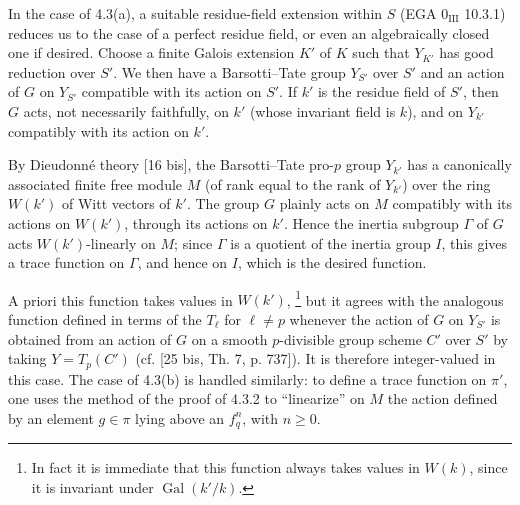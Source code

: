 In the case of 4.3(a), a suitable residue-field extension within $S$
(EGA $0_{\mathrm{III}}$ 10.3.1) reduces us to the case of a perfect
residue field, or even an algebraically closed one if desired.  Choose
a finite Galois extension $K'$ of $K$ such that $Y_{K'}$ has good
reduction over $S'$.  We then have a Barsotti--Tate group $Y_{S'}$ over
$S'$ and an action of $G$ on $Y_{S'}$ compatible with its action on
$S'$.  If $k'$ is the residue field of $S'$, then $G$ acts, not
necessarily faithfully, on $k'$ (whose invariant field is $k$), and on
$Y_{k'}$ compatibly with its action on $k'$.

By Dieudonn\'e theory [16 bis], the Barsotti--Tate pro-$p$ group $Y_{k'}$
has a canonically associated finite free module $M$ (of rank equal to
the rank of $Y_{k'}$) over the ring $W(k')$ of Witt vectors of $k'$.
The group $G$ plainly acts on $M$ compatibly with its actions on
$W(k')$, through its actions on $k'$.  Hence the inertia subgroup
$\Gamma$ of $G$ acts $W(k')$-linearly on $M$; since $\Gamma$ is a
quotient of the inertia group $I$, this gives a trace function on
$\Gamma$, and hence on $I$, which is the desired function.

A priori this function takes values in $W(k')$,
\footnote{In fact it is immediate that this function always takes values
in $W(k)$, since it is invariant under $\operatorname{Gal}(k'/k)$.}
but it agrees with the analogous function defined in terms of the
$T_\ell$ for $\ell\neq p$ whenever the action of $G$ on $Y_{S'}$ is
obtained from an action of $G$ on a smooth $p$-divisible group scheme
$C'$ over $S'$ by taking $Y=T_p(C')$ (cf. [25 bis, Th. 7, p. 737]).
It is therefore integer-valued in this case.  The case of 4.3(b) is
handled similarly: to define a trace function on $\pi'$, one uses the
method of the proof of 4.3.2 to ``linearize'' on $M$ the action defined
by an element $g\in\pi$ lying above an $f_q^n$, with $n\geq0$.
